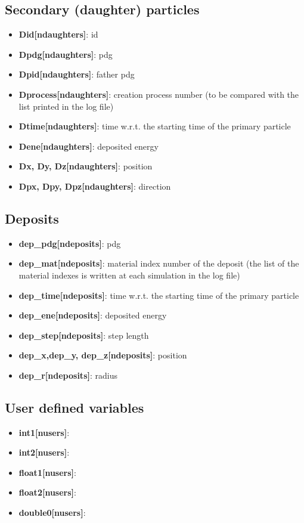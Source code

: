 \documentclass[twocolumn, 10pt]{article}
\begin{document}
\subsection{Secondary (daughter) particles}
\begin{itemize}
\item {\bf{Did[ndaughters]}}:  id 
\item {\bf{Dpdg[ndaughters]}}: pdg 
\item {\bf{Dpid[ndaughters]}}: father pdg
\item {\bf{Dprocess[ndaughters]}}: creation process number (to be compared with the list printed in the log file) 
\item {\bf{Dtime[ndaughters]}}: time w.r.t. the starting time of the primary particle
\item {\bf{Dene[ndaughters]}}:   deposited energy
\item {\bf{Dx, Dy, Dz[ndaughters]}}:	 position
\item {\bf{Dpx, Dpy, Dpz[ndaughters]}}:   direction
\end{itemize}

\subsection{Deposits}
\begin{itemize}
\item {\bf{dep\_pdg[ndeposits]}}:    pdg 
\item {\bf{dep\_mat[ndeposits]}}:    material index number of the deposit (the list of the material indexes is written at each
simulation in the log file)
\item {\bf{dep\_time[ndeposits]}}:   time w.r.t. the starting time of the primary particle
\item {\bf{dep\_ene[ndeposits]}}:    deposited energy
\item {\bf{dep\_step[ndeposits]}}:   step length
\item {\bf{dep\_x,dep\_y, dep\_z[ndeposits]}}:       position
\item {\bf{dep\_r[ndeposits]}}:     radius
\end{itemize}


\subsection{User defined variables}
\begin{itemize}
\item {\bf{int1[nusers]}}:  
\item {\bf{int2[nusers]}}:
\item {\bf{float1[nusers]}}: 
\item {\bf{float2[nusers]}}:	
\item {\bf{double0[nusers]}}:  
\end{itemize}
\end{document}
